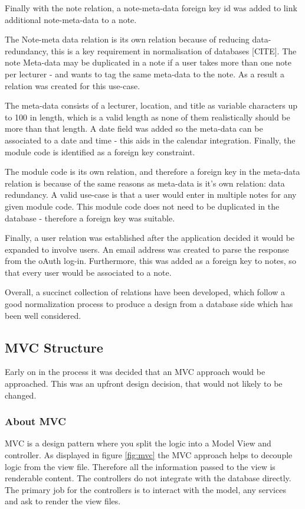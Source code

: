 Finally with the note relation, a note-meta-data foreign key id was added to link additional note-meta-data to a note.

The Note-meta data relation is its own relation because of reducing data-redundancy, this is a key requirement in normalisation of databases [CITE]. The note Meta-data may be duplicated in a note if a user takes more than one note per lecturer - and wants to tag the same meta-data to the note. As a result a relation was created for this use-case.

The meta-data consists of a lecturer, location, and title as variable characters up to 100 in length, which is a valid length as none of them realistically should be more than that length. A date field was added so the meta-data can be associated to a date and time - this aids in the calendar integration. Finally, the module code is identified as a foreign key constraint.

The module code is its own relation, and therefore a foreign key in the meta-data relation is because of the same reasons as meta-data is it's own relation: data redundancy. A valid use-case is that a user would enter in multiple notes for any given module code. This module code does not need to be duplicated in the database - therefore a foreign key was suitable.

Finally, a user relation was established after the application decided it would be expanded to involve users. An email address was created to parse the response from the oAuth log-in. Furthermore, this was added as a foreign key to notes, so that every user would be associated to a note.

Overall, a succinct collection of relations have been developed, which follow a good normalization process to produce a design from a database side which has been well considered.



\subsection{MVC Structure}
Early on in the process it was decided that an MVC approach would be approached. This was an upfront design decision, that would not likely to be changed.

\subsubsection{About MVC}
MVC is a design pattern where you split the logic into a Model View and controller. As displayed in figure \ref{fig:mvc} the MVC approach helps to decouple logic from the view file. Therefore all the information passed to the view is renderable content. The controllers do not integrate with the database directly. The primary job for the controllers is to interact with the model, any services and ask to render the view files.

